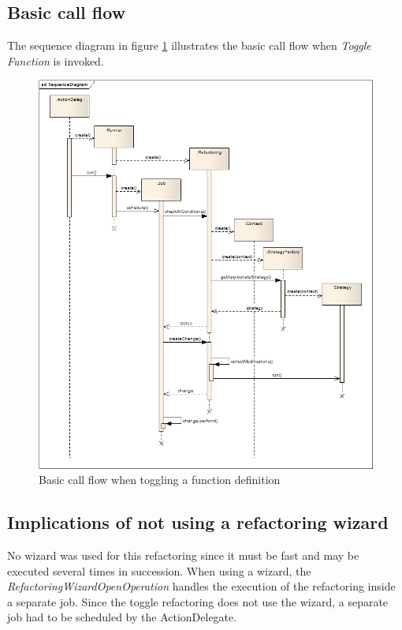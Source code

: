 \subsection{Basic call flow}
The sequence diagram in figure \ref{sd} illustrates the basic call flow when 
\textit{Toggle Function} is invoked.
\begin{figure}[h]
  \centering
  \includegraphics[width=\textwidth]{seqdiagram/SequenceDiagram.png}
  \caption{Basic call flow when toggling a function definition}
  \label{sd}
\end{figure}

\subsection{Implications of not using a refactoring wizard}
No wizard was used for this refactoring since it must be fast and may be 
executed several times in succession. When using a wizard, the 
\textit{RefactoringWizardOpenOperation} handles the execution of the refactoring 
inside a separate job. Since the toggle refactoring does not use the wizard, a 
separate job had to be scheduled by the ActionDelegate.

